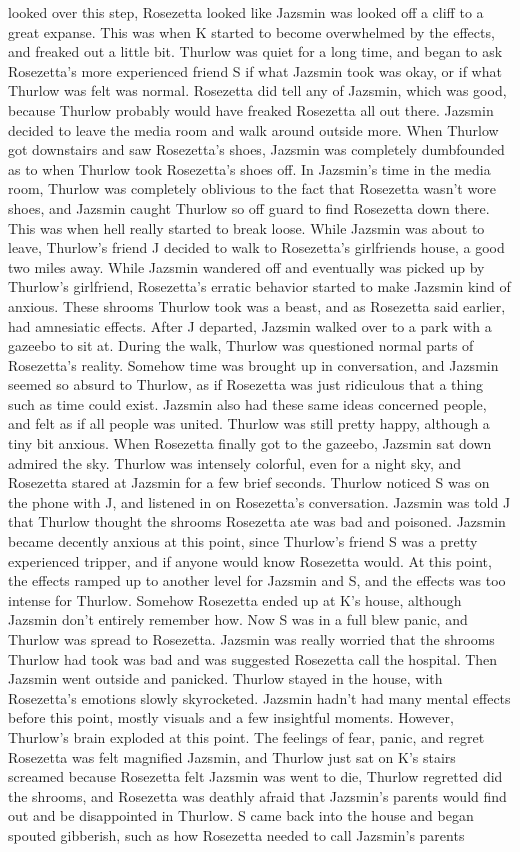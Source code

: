 \documentclass[12pt]{book}
\begin{document}
looked over this step, Rosezetta looked like Jazsmin was looked off a cliff to a great expanse. This was when K started to become overwhelmed by the effects, and freaked out a little bit. Thurlow was quiet for a long time, and began to ask Rosezetta's more experienced friend S if what Jazsmin took was okay, or if what Thurlow was felt was normal. Rosezetta did tell any of Jazsmin, which was good, because Thurlow probably would have freaked Rosezetta all out there. Jazsmin decided to leave the media room and walk around outside more. When Thurlow got downstairs and saw Rosezetta's shoes, Jazsmin was completely dumbfounded as to when Thurlow took Rosezetta's shoes off. In Jazsmin's time in the media room, Thurlow was completely oblivious to the fact that Rosezetta wasn't wore shoes, and Jazsmin caught Thurlow so off guard to find Rosezetta down there. This was when hell really started to break loose. While Jazsmin was about to leave, Thurlow's friend J decided to walk to Rosezetta's girlfriends house, a good two miles away. While Jazsmin wandered off and eventually was picked up by Thurlow's girlfriend, Rosezetta's erratic behavior started to make Jazsmin kind of anxious. These shrooms Thurlow took was a beast, and as Rosezetta said earlier, had amnesiatic effects. After J departed, Jazsmin walked over to a park with a gazeebo to sit at. During the walk, Thurlow was questioned normal parts of Rosezetta's reality. Somehow time was brought up in conversation, and Jazsmin seemed so absurd to Thurlow, as if Rosezetta was just ridiculous that a thing such as time could exist. Jazsmin also had these same ideas concerned people, and felt as if all people was united. Thurlow was still pretty happy, although a tiny bit anxious. When Rosezetta finally got to the gazeebo, Jazsmin sat down admired the sky. Thurlow was intensely colorful, even for a night sky, and Rosezetta stared at Jazsmin for a few brief seconds. Thurlow noticed S was on the phone with J, and listened in on Rosezetta's conversation. Jazsmin was told J that Thurlow thought the shrooms Rosezetta ate was bad and poisoned. Jazsmin became decently anxious at this point, since Thurlow's friend S was a pretty experienced tripper, and if anyone would know Rosezetta would. At this point, the effects ramped up to another level for Jazsmin and S, and the effects was too intense for Thurlow. Somehow Rosezetta ended up at K's house, although Jazsmin don't entirely remember how. Now S was in a full blew panic, and Thurlow was spread to Rosezetta. Jazsmin was really worried that the shrooms Thurlow had took was bad and was suggested Rosezetta call the hospital. Then Jazsmin went outside and panicked. Thurlow stayed in the house, with Rosezetta's emotions slowly skyrocketed. Jazsmin hadn't had many mental effects before this point, mostly visuals and a few insightful moments. However, Thurlow's brain exploded at this point. The feelings of fear, panic, and regret Rosezetta was felt magnified Jazsmin, and Thurlow just sat on K's stairs screamed because Rosezetta felt Jazsmin was went to die, Thurlow regretted did the shrooms, and Rosezetta was deathly afraid that Jazsmin's parents would find out and be disappointed in Thurlow. S came back into the house and began spouted gibberish, such as how Rosezetta needed to call Jazsmin's parents 
\end{document}
